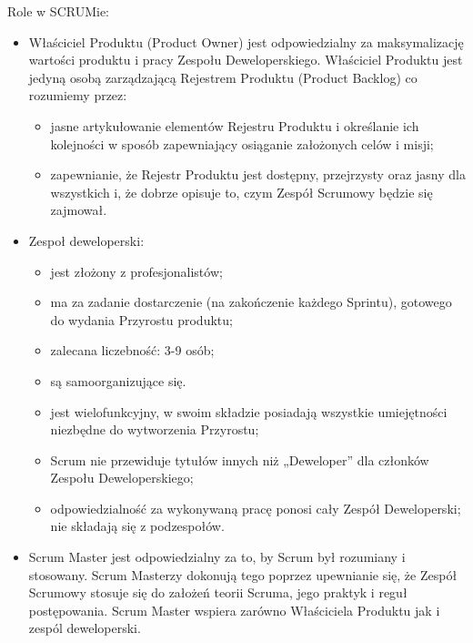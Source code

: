 \documentclass[a4paper]{article}
\begin{document}
Role w SCRUMie:
\begin{itemize}
    \item Właściciel Produktu (Product Owner) jest odpowiedzialny za
maksymalizację wartości produktu i pracy Zespołu
Deweloperskiego. Właściciel Produktu jest jedyną osobą zarządzającą
Rejestrem Produktu (Product Backlog) co
rozumiemy przez:
    \begin{itemize}
        \item jasne artykułowanie elementów Rejestru Produktu i określanie
ich kolejności w sposób zapewniający osiąganie założonych
celów i misji;
        \item zapewnianie, że Rejestr Produktu jest dostępny, przejrzysty
oraz jasny dla wszystkich i, że dobrze opisuje to, czym
Zespół Scrumowy będzie się zajmował.
    \end{itemize}
    \item Zespoł deweloperski:
    \begin{itemize}
        \item jest złożony z profesjonalistów;
        \item ma za zadanie dostarczenie (na zakończenie
każdego Sprintu), gotowego do wydania
Przyrostu produktu;
        \item zalecana liczebność: 3-9 osób;
        \item są samoorganizujące się.
        \item jest wielofunkcyjny, w swoim składzie posiadają
wszystkie umiejętności niezbędne do
wytworzenia Przyrostu;
        \item Scrum nie przewiduje tytułów innych niż
„Deweloper” dla członków Zespołu
Deweloperskiego;
        \item odpowiedzialność za wykonywaną pracę ponosi
cały Zespół Deweloperski; nie składają się z
podzespołów.
    \end{itemize}
    \item Scrum Master jest odpowiedzialny za to, by Scrum był rozumiany i
stosowany. Scrum Masterzy dokonują tego poprzez upewnianie się, że
Zespół Scrumowy stosuje się do założeń teorii Scruma, jego praktyk i reguł postępowania.
Scrum Master wspiera zarówno Właściciela Produktu jak i zespól deweloperski.
\end{itemize}
\end{document}
